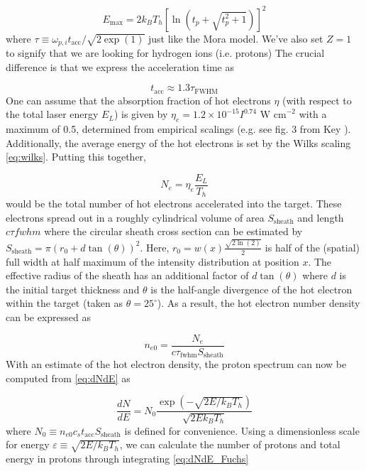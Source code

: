 \begin{equation}
	E_\text{max} = 2 k_B T_h [\ln(t_p + \sqrt{t_p^2 + 1})]^2 \label{eq:fuchs_maxE}
\end{equation}
where $\tau \equiv \omega_{p,i} t_\text{acc} / \sqrt{2 \exp(1)}$ just like the Mora model. We've also set $Z=1$ to signify that we are looking for hydrogen ions (i.e. protons) The crucial difference is that we express the acceleration time as 

\begin{equation}
	t_\text{acc} \approx 1.3 \tau_\text{FWHM} \label{eq:fuchs_multiplier}
\end{equation}
One can assume that the absorption fraction of hot electrons $\eta$ (with respect to the total laser energy $E_L$) is given by $\eta_e = 1.2 \times 10^{-15} I^{0.74} \text{ W cm}^{-2}$ with a maximum of 0.5, determined from empirical scalings (e.g. see fig. 3 from Key \cite{Key_1998_PoP}). Additionally, the average energy of the hot electrons is set by the Wilks scaling \cref{eq:wilks}. Putting this together, 

\begin{equation}
	N_e = \eta_e \frac{E_L}{T_h}
\end{equation}
would be the total number of hot electrons accelerated into the target. These electrons spread out in a roughly cylindrical volume of area $S_\text{sheath}$ and length $c \tau{fwhm}$ where the circular sheath cross section can be estimated by $S_\text{sheath} = \pi (r_0 + d \tan(\theta))^2$. Here, $r_0 = w(x) \frac{\sqrt{2 \ln(2)}}{2}$ is half of the (spatial) full width at half maximum of the intensity distribution at position $x$. The effective radius of the sheath has an additional factor of $d \tan(\theta)$ where $d$ is the initial target thickness and $\theta$ is the half-angle divergence of the hot electron within the target (taken as $\theta = 25^\circ$). As a result, the hot electron number density can be expressed as 
	
\begin{equation}
	n_{e0} = \frac{N_e}{c \tau_\text{fwhm} S_\text{sheath}}
\end{equation}
With an estimate of the hot electron density, the proton spectrum can now be computed from \cref{eq:dNdE} as 

\begin{equation}
	\frac{dN}{dE} = N_0 \frac{\exp(-\sqrt{2 E/k_B T_h})}{\sqrt{2 E k_B T_h}} \label{eq:dNdE_Fuchs}
\end{equation}
where $N_0 \equiv n_{e0} c_s t_\text{acc} S_\text{sheath}$ is defined for convenience. Using a dimensionless scale for energy $\varepsilon \equiv \sqrt{2 E / k_B T_h}$, we can calculate the number of protons and total energy in protons through integrating \cref{eq:dNdE_Fuchs}


